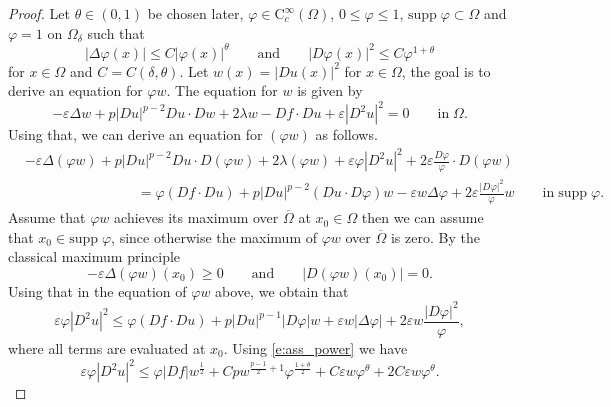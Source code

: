 \documentclass[11pt,reqno]{amsart}
\numberwithin{figure}{section}
\theoremstyle{plain}
\theoremstyle{remark}
\numberwithin{equation}{section}
\begin{document}
\begin{proof} Let $\theta\in (0,1)$ be chosen later, $\varphi\in \mathrm{C}_c^\infty(\Omega)$, $0\leq \varphi\leq 1$, $\mathrm{supp}\;\varphi\subset \Omega$ and $\varphi = 1$ on $\Omega_\delta$ such that
\begin{equation}\label{e:ass_power}
    |\Delta \varphi(x)| \leq C|\varphi(x)|^\theta \qquad\text{and}\qquad |D \varphi(x)|^2 \leq C\varphi^{1+\theta}
\end{equation}
for $x\in \Omega$ and $C = C(\delta,\theta)$.
Let $w(x) = |Du(x)|^2$ for $x\in \Omega$, the goal is to derive an equation for $\varphi w$. The equation for $w$ is given by
\begin{equation*}
    -\varepsilon \Delta w + p|D u|^{p-2}D u \cdot D w + 2\lambda w - D f\cdot D u + \varepsilon |D^2u|^2 = 0 \qquad\text{in}\;\Omega.
\end{equation*}
Using that, we can derive an equation for $(\varphi w)$ as follows.
\begin{align*}
    &-\varepsilon \Delta (\varphi w) + p|D u|^{p-2}D u \cdot D (\varphi w) + 2\lambda (\varphi w) + \varepsilon \varphi|D^2u|^2 + 2\varepsilon \frac{D \varphi}{\varphi}\cdot D (\varphi w) \\
    &\qquad\qquad\qquad\qquad = \varphi(D f\cdot D u) + p|D u|^{p-2}(D u\cdot D \varphi)w -\varepsilon w \Delta \varphi + 2\varepsilon \frac{|D \varphi|^2}{\varphi}w
    \qquad\text{in}\;\mathrm{supp}\;\varphi.
\end{align*}
Assume that $\varphi w$ achieves its maximum over $\overline{\Omega}$ at $x_0\in \Omega$ then we can assume that $x_0\in \mathrm{supp}\;\varphi$, since otherwise the maximum of $\varphi w$ over $\overline{\Omega}$ is zero. By the classical maximum principle 
\begin{equation*}
    -\varepsilon \Delta(\varphi w)(x_0)\geq 0 \qquad\text{and}\qquad |D(\varphi w)(x_0)| = 0.
\end{equation*}
Using that in the equation of $\varphi w$ above, we obtain that
\begin{equation*}
    \varepsilon \varphi|D^2u|^2 \leq  \varphi (Df\cdot Du)+ p|Du|^{p-1} |D\varphi|w + \varepsilon w |\Delta\varphi|  + 2\varepsilon  w\frac{|D\varphi|^2}{\varphi},
\end{equation*}
where all terms are evaluated at $x_0$. Using \eqref{e:ass_power} we have
\begin{equation}\label{e:est_for_D^2u}
    \varepsilon \varphi|D^2u|^2 \leq  \varphi |Df|w^{\frac{1}{2}}+ Cp w^{\frac{p-1}{2}+1} \varphi^{\frac{1+\theta}{2}} + C\varepsilon w \varphi^{\theta} + 2C\varepsilon  w\varphi^\theta.

\end{equation}
\end{proof}
\end{document}
